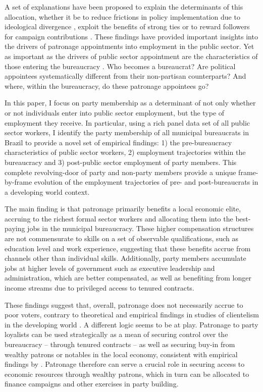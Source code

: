 \documentclass[12pt,a4paper]{article}
\begin{document}
A set of explanations have been proposed to explain the determinants of this allocation, whether it be to reduce frictions in policy implementation due to ideological divergence \citep{krause2016experiential}, exploit the benefits of strong ties \citep{toral2019benefits} or to reward followers for campaign contributions \citep{colonnelli2018patronage}. These findings have provided important insights into the drivers of patronage appointments into employment in the public sector. Yet as important as the drivers of public sector appointment are the characteristics of those entering the bureaucracy \citep{finan2015personnel}. Who becomes a bureaucrat? Are political appointees systematically different from their non-partisan counterparts? And where, within the bureaucracy, do these patronage appointees go?

In this paper, I focus on party membership as a determinant of not only whether or not individuals enter into public sector employment, but the type of employment they receive. In particular, using a rich panel data set of all public sector workers, I identify the party membership of all municipal bureaucrats in Brazil to provide a novel set of empirical findings: 1) the pre-bureaucracy characteristics of public sector workers, 2) employment trajectories within the bureaucracy and 3) post-public sector employment of party members. This complete revolving-door of party and non-party members provide a unique frame-by-frame evolution of the employment trajectories of pre- and post-bureaucrats in a developing world context.

The main finding is that patronage primarily benefits a local economic elite, accruing to the richest formal sector workers and allocating them into the best-paying jobs in the municipal bureaucracy. These higher compensation structures are not commensurate to skills on a set of observable qualifications, such as education level and work experience, suggesting that these benefits accrue from channels other than individual skills. Additionally, party members accumulate jobs at higher levels of government such as executive leadership and administration, which are better compensated, as well as benefiting from longer income streams due to privileged access to tenured contracts.

These findings suggest that, overall, patronage does not necessarily accrue to poor voters, contrary to theoretical and empirical findings in studies of clientelism in the developing world \citep{stokes2013brokers}. A different logic seems to be at play. Patronage to party loyalists can be used strategically as a mean of securing control over the bureaucracy -- through tenured contracts -- as well as securing buy-in from wealthy patrons or notables in the local economy, consistent with empirical findings by \citet{colonnelli2018patronage}. Patronage therefore can serve a crucial role in securing access to economic resources through wealthy patrons, which in turn can be allocated to finance campaigns and other exercises in party building.
\end{document}
